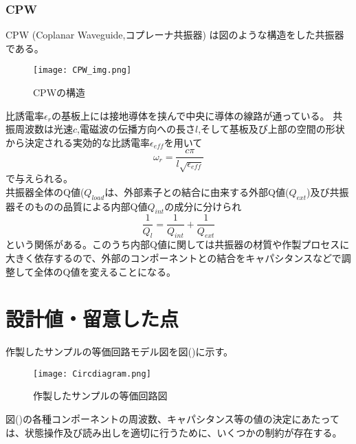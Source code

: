 \subsubsection{CPW}
CPW (Coplanar Waveguide,コプレーナ共振器) は図のような構造をした共振器である。
\begin{figure}[H]
    \begin{center}
        \texttt{[image: CPW\_img.png]}
        \caption{CPWの構造}
    \end{center}
\end{figure}
比誘電率$\epsilon_r$の基板上には接地導体を挟んで中央に導体の線路が通っている。
共振周波数は光速$c$,電磁波の伝播方向への長さ$l$,そして基板及び上部の空間の形状から決定される実効的な比誘電率$\epsilon_{eff}$を用いて
\begin{equation}
    \omega_{r}=\frac{c \pi}{l \sqrt{\epsilon_{e f f}}}
\end{equation}
で与えられる。\\ %
共振器全体のQ値($Q_{load}$は、外部素子との結合に由来する外部Q値($Q_{ext}$)及び共振器そのものの品質による内部Q値$Q_{int}$の成分に分けられ
\begin{equation}
    \frac{1}{Q_{l}}=\frac{1}{Q_{int}}+\frac{1}{Q_{ext}}
\end{equation}
という関係がある。このうち内部Q値に関しては共振器の材質や作製プロセスに大きく依存するので、外部のコンポーネントとの結合をキャパシタンスなどで調整して全体のQ値を変えることになる。

\section{設計値・留意した点}
作製したサンプルの等価回路モデル図を図()に示す。
\begin{figure}[H]
    \begin{center}
        \texttt{[image: Circdiagram.png]}
        \caption{作製したサンプルの等価回路図}
    \end{center}
\end{figure}
図()の各種コンポーネントの周波数、キャパシタンス等の値の決定にあたっては、状態操作及び読み出しを適切に行うために、いくつかの制約が存在する。
